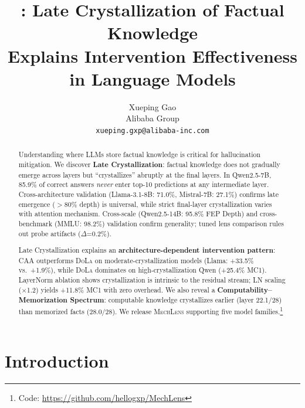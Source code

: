 \documentclass{article}
\title{\mechlens{}: Late Crystallization of Factual Knowledge \\
Explains Intervention Effectiveness in Language Models}
\author{
  Xueping Gao\\
  Alibaba Group\\
  \texttt{xueping.gxp@alibaba-inc.com}
}
\newcommand{\mechlens}{\textsc{MechLens}}
\newcommand{\dola}{\textsc{DoLa}}
\newcommand{\caa}{\textsc{CAA}}
\begin{document}
\ifcolmsubmission
\linenumbers
\fi

\maketitle

\begin{abstract}
Understanding where LLMs store factual knowledge is critical for hallucination mitigation. We discover \textbf{Late Crystallization}: factual knowledge does not gradually emerge across layers but ``crystallizes'' abruptly at the final layers. In Qwen2.5-7B, 85.9\% of correct answers \emph{never} enter top-10 predictions at any intermediate layer. Cross-architecture validation (Llama-3.1-8B: 71.0\%, Mistral-7B: 27.1\%) confirms late emergence ($>$80\% depth) is universal, while strict final-layer crystallization varies with attention mechanism. Cross-scale (Qwen2.5-14B: 95.8\% FEP Depth) and cross-benchmark (MMLU: 98.2\%) validation confirm generality; tuned lens comparison rules out probe artifacts ($\Delta$=0.2\%).

Late Crystallization explains an \textbf{architecture-dependent intervention pattern}: \caa{} outperforms \dola{} on moderate-crystallization models (Llama: +33.5\% vs.\ +1.9\%), while \dola{} dominates on high-crystallization Qwen (+25.4\% MC1). LayerNorm ablation shows crystallization is intrinsic to the residual stream; LN scaling ($\times$1.2) yields +11.8\% MC1 with zero overhead. We also reveal a \textbf{Computability--Memorization Spectrum}: computable knowledge crystallizes earlier (layer 22.1/28) than memorized facts (28.0/28). We release \mechlens{} supporting five model families.\footnote{Code: \url{https://github.com/hellogxp/MechLens}}
\end{abstract}

\section{Introduction}
\label{sec:introduction}
\end{document}
